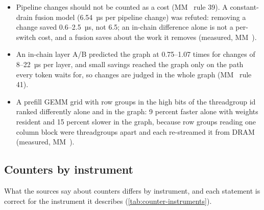 \begin{itemize}
\item Pipeline changes should not be counted as a cost (MM~ rule 39). A constant-drain fusion model (6.54~µs per pipeline
  change) was refuted: removing a change saved 0.6–2.5~µs, not 6.5; an in-chain difference alone is not a per-switch
  cost, and a fusion saves about the work it removes (measured, MM~).
\item An in-chain layer A/B predicted the graph at 0.75–1.07 times for changes of 8–22~µs per layer, and small savings
  reached the graph only on the path every token waits for, so changes are judged in the whole graph (MM~ rule 41).
\item A prefill GEMM grid with row groups in the high bits of the threadgroup id ranked differently alone and in the graph: 9
  percent faster alone with weights resident and 15 percent slower in the graph, because row groups reading one column
  block were  threadgroups apart and each re-streamed it from DRAM (measured, MM~).
\end{itemize}

\subsection*{Counters by instrument}

What the sources say about counters differs by instrument, and each statement is correct for the instrument it
describes (\cref{tab:counter-instruments}).

